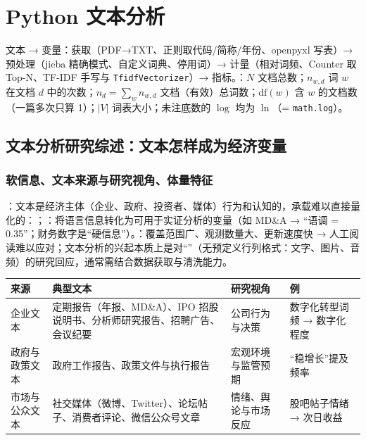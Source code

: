 \chapter{Python 文本分析}
\begingroup\sloppy\setlength{\emergencystretch}{3em}
\newenvironment{tabD08a}{\par\smallskip\noindent\footnotesize}{\par\smallskip}
\noindent{}\quad 文本 → 变量：获取（PDF→TXT、正则取代码/简称/年份、openpyxl 写表）→ 预处理（jieba 精确模式、自定义词典、停用词）→ 计量（相对词频、Counter 取 Top-N、TF-IDF 手写与 \texttt{TfidfVectorizer}）→ 指标。：$N$ 文档总数；$n_{w,d}$ 词 $w$ 在文档 $d$ 中的次数；$n_d=\sum_w n_{w,d}$ 文档（有效）总词数；$\mathrm{df}(w)$ 含 $w$ 的文档数（一篇多次只算 1）；$|V|$ 词表大小；未注底数的 $\log$ 均为 $\ln$（= \texttt{math.log}）。

\section{文本分析研究综述：文本怎样成为经济变量}

\subsection{软信息、文本来源与研究视角、体量特征}
：文本是经济主体（企业、政府、投资者、媒体）行为和认知的，承载难以直接量化的：；：将语言信息转化为可用于实证分析的变量（如 MD\&A → “语调 = 0.35”；财务数字是“硬信息”）。：覆盖范围广、观测数量大、更新速度快 → 人工阅读难以应对；文本分析的兴起本质上是对“”（无预定义行列格式：文字、图片、音频）的研究回应，通常需结合数据获取与清洗能力。
\begin{tabD08a}
\begin{tabularx}{\linewidth}{@{}p{2.1cm}LLL@{}}
\toprule
来源 & 典型文本 & 研究视角 & 例 \\
\midrule
企业文本 & 定期报告（年报、MD\&A）、IPO 招股说明书、分析师研究报告、招聘广告、会议纪要 & 公司行为与决策 & 数字化转型词频 → 数字化程度 \\
政府与政策文本 & 政府工作报告、政策文件与执行报告 & 宏观环境与监管预期 & “稳增长”提及频率 \\
市场与公众文本 & 社交媒体（微博、Twitter）、论坛帖子、消费者评论、微信公众号文章 & 情绪、舆论与市场反应 & 股吧帖子情绪 → 次日收益 \\
\bottomrule
\end{tabularx}
\end{tabD08a}

